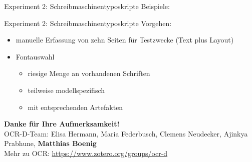 \documentclass{bbawslides}
\begin{document}
\begin{bbawslide}{Experiment 2: Schreibmaschinentyposkripte}
  \vspace*{7mm}%
  \centerslidestrue%
  Beispiele:
\end{bbawslide}

\begin{bbawslide}{Experiment 2: Schreibmaschinentyposkripte}
  \vspace*{7mm}%
  \centerslidestrue%
  Vorgehen:
  \begin{itemize}
    \item manuelle Erfassung von zehn Seiten für Testzwecke (Text plus Layout)
    \item Fontauswahl
    \begin{itemize}
      \item riesige Menge an vorhandenen Schriften
      \item teilweise modellspezifisch
      \item mit entsprechenden Artefakten
    \end{itemize}
  \end{itemize}
\end{bbawslide}

\begin{bbawpart}{\Large\bf Danke für Ihre Aufmerksamkeit!\\}
OCR-D-Team: Elisa Hermann, Maria Federbusch, Clemens Neudecker, Ajinkya Prabhune, \textbf{Matthias Boenig}\\
Mehr zu OCR: \url{https://www.zotero.org/groups/ocr-d}
\end{bbawpart}
\end{document}
